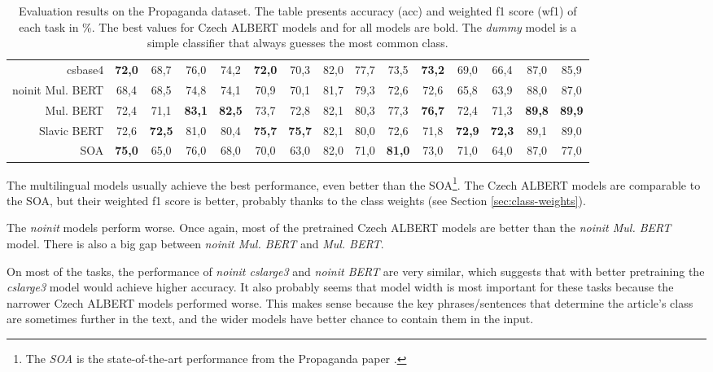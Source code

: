 \documentclass[
  printed, %
  color,   %
  table,   %
  oneside, %
  lof,     %
  lot,     %
]{fithesis3}
\begin{document}
\begin{table}[hbt]
\begin{adjustbox}{center}
\begin{tabular}{r|c|c|c|c|c|c|c|c|c|c|c|c|c|c}
        csbase4 & \textbf{72,0} & 68,7 & 76,0 & 74,2 & \textbf{72,0} & 70,3 & 82,0 & 77,7 & 73,5 & \textbf{73,2} & 69,0 & 66,4 & 87,0 & 85,9 \\
        
        noinit Mul. BERT & 68,4 & 68,5 & 74,8 & 74,1 & 70,9 & 70,1 & 81,7 & 79,3 & 72,6 & 72,6 & 65,8 & 63,9 & 88,0 & 87,0  \\
        
        Mul. BERT & 72,4 & 71,1 & \textbf{83,1} & \textbf{82,5} & 73,7 & 72,8 & 82,1 & 80,3 & 77,3 & \textbf{76,7} & 72,4 & 71,3 & \textbf{89,8} & \textbf{89,9} \\
    
        Slavic BERT & 72,6 & \textbf{72,5} & 81,0 & 80,4 & \textbf{75,7} & \textbf{75,7} & 82,1 & 80,0 & 72,6 & 71,8 & \textbf{72,9} & \textbf{72,3} & 89,1 & 89,0 \\

        SOA & \textbf{75,0} & 65,0 & 76,0 & 68,0 & 70,0 & 63,0 & 82,0 & 71,0 & \textbf{81,0} & 73,0 & 71,0 & 64,0 & 87,0 & 77,0 \\


\end{tabular}
\end{adjustbox}
\caption[Evaluation results on Propaganda]
{Evaluation results on the Propaganda dataset. The table presents accuracy (acc) and weighted f1 score (wf1) of each task in \%. The best values for Czech ALBERT models and for all models are bold. The \textit{dummy} model is a simple classifier that always guesses the most common class.}
\label{tab:prop-results}
\end{table} %

The multilingual models usually achieve the best performance, even better than the SOA\footnote{The \textit{SOA} is the state-of-the-art performance from the Propaganda paper \parencite{propaganda}.}. The Czech ALBERT models are comparable to the SOA, but their weighted f1 score is better, probably thanks to the class weights (see Section \ref{sec:class-weights}).

The \textit{noinit} models perform worse. Once again, most of the pretrained Czech ALBERT models are better than the \textit{noinit Mul. BERT} model. There is also a big gap between \textit{noinit Mul. BERT} and \textit{Mul. BERT}.

On most of the tasks, the performance of \textit{noinit cslarge3} and \textit{noinit BERT} are very similar, which suggests that with better pretraining the \textit{cslarge3} model would achieve higher accuracy. It also probably seems that model width is most important for these tasks because the narrower Czech ALBERT models performed worse. This makes sense because the key phrases/sentences that determine the article's class are sometimes further in the text, and the wider models have better chance to contain them in the input.
\end{document}
